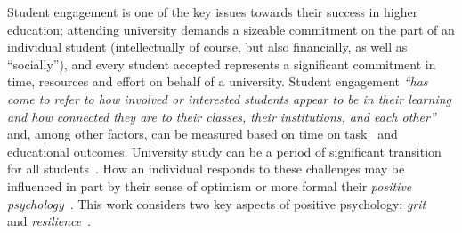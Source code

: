\documentclass[sigconf]{acmart}
\begin{document}

Student engagement is one of the key issues towards their success in higher education; attending university demands a sizeable commitment on the part of an individual student (intellectually of course, but also financially, as well as ``socially''), and every student accepted represents a significant commitment in time, resources and effort on behalf of a university. Student engagement {\em``has come to refer to how involved or interested students appear to be in their learning and how connected they are to their classes, their institutions, and each other''}~\citep[p.~38]{Axelson2010} and, among other factors, can be measured based on time on task~\cite{kuh2009national} and educational outcomes. University study can be a period of significant transition for all students~\cite{Tinto1975}. How an individual responds to these challenges may be influenced in part by their sense of optimism or more formal their {\em positive psychology}~\cite{Seligman90}. This work considers two key aspects of positive psychology: {\em{grit}}~\cite{Duckworth2007,Duckworth2016} and {\em resilience}~\cite{Clarke2010}.  

\end{document}
